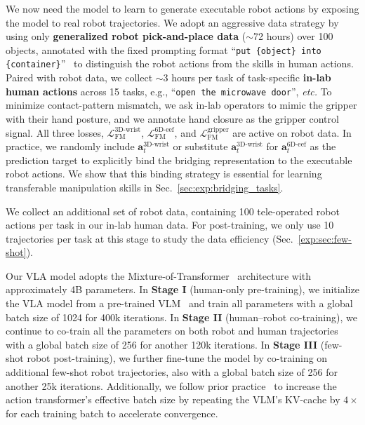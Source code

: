 % 
We now need the model to learn to generate executable robot actions by exposing the model to real robot trajectories.
% 
We adopt an aggressive data strategy by using only \textbf{generalized robot pick-and-place data} ($\sim$72 hours) over 100 objects, annotated with the fixed prompting format ``\texttt{put \{object\} into \{container\}}''~\cite{cheang2025gr3} to distinguish the robot actions from the skills in human actions.
% 
Paired with robot data, we collect $\sim$3 hours per task of task-specific \textbf{in-lab human actions} across 15 tasks, e.g., ``\texttt{open the microwave door}'', \textit{etc.}
% 
To minimize contact-pattern mismatch, we ask in-lab operators to mimic the gripper with their hand posture, and we annotate hand closure as the gripper control signal.
% 
All three losses, $\mathcal{L}_{\text{FM}}^{\text{3D-wrist}}$, $\mathcal{L}_{\text{FM}}^{\text{6D-eef}}$, and $\mathcal{L}_{\text{FM}}^{\text{gripper}}$ are active on robot data.
% 
In practice, we randomly include $\mathbf{a}_t^{\text{3D-wrist}}$ or substitute $\mathbf{a}_t^{\text{3D-wrist}}$ for $\mathbf{a}_t^{\text{6D-eef}}$ as the prediction target to explicitly bind the bridging representation to the executable robot actions. 
% 
We show that this binding strategy is essential for learning transferable manipulation skills in Sec.~\ref{sec:exp:bridging_tasks}.





%
We collect an additional set of robot data, containing 100 tele-operated robot actions per task in our in-lab human data.
% 
For post-training, we only use 10 trajectories per task at this stage to study the data efficiency (Sec.~\ref{exp:sec:few-shot}).



%
Our VLA model adopts the Mixture-of-Transformer~\cite{liang2024mixture,black2024pi_0} architecture with approximately 4B parameters.
% 
In \textbf{Stage I} (human-only pre-training), we initialize the VLA model from a pre-trained VLM~\cite{bai2025qwen25vltechnicalreport} and train all parameters with a global batch size of 1024 for 400k iterations.
% 
In \textbf{Stage II} (human--robot co-training), we continue to co-train all the parameters on both robot and human trajectories with a global batch size of 256 for another 120k iterations.
% 
In \textbf{Stage III} (few-shot robot post-training), we further fine-tune the model by co-training on additional few-shot robot trajectories, also with a global batch size of 256 for another 25k iterations.
% 
Additionally, we follow prior practice~\cite{li2024autoregressive,cheang2025gr3} to increase the action transformer's effective batch size by repeating the VLM's KV-cache by $4\times$ for each training batch to accelerate convergence.







